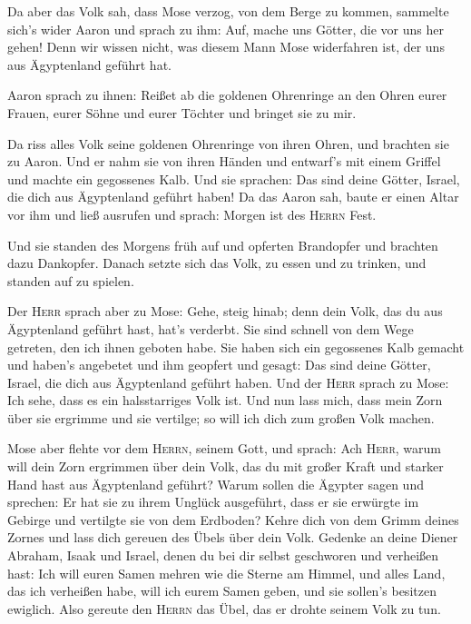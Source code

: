  Da aber das Volk sah, dass Mose verzog, von dem Berge zu
kommen, sammelte sich's wider Aaron und sprach zu ihm: Auf, mache uns
Götter, die vor uns her gehen! Denn wir wissen nicht, was diesem Mann
Mose widerfahren ist, der uns aus Ägyptenland geführt hat.

 Aaron sprach zu ihnen: Reißet ab die goldenen Ohrenringe
an den Ohren eurer Frauen, eurer Söhne und eurer Töchter und bringet sie
zu mir.

 Da riss alles Volk seine goldenen Ohrenringe von ihren
Ohren, und brachten sie zu Aaron.  Und er nahm sie von
ihren Händen und entwarf's mit einem Griffel und machte ein gegossenes
Kalb. Und sie sprachen: Das sind deine Götter, Israel, die dich aus
Ägyptenland geführt haben!  Da das Aaron sah, baute er
einen Altar vor ihm und ließ ausrufen und sprach: Morgen ist des
\textsc{Herrn} Fest.

 Und sie standen des Morgens früh auf und opferten
Brandopfer und brachten dazu Dankopfer. Danach setzte sich das Volk, zu
essen und zu trinken, und standen auf zu spielen.

 Der \textsc{Herr} sprach aber zu Mose: Gehe, steig hinab;
denn dein Volk, das du aus Ägyptenland geführt hast, hat's verderbt.
 Sie sind schnell von dem Wege getreten, den ich ihnen
geboten habe. Sie haben sich ein gegossenes Kalb gemacht und haben's
angebetet und ihm geopfert und gesagt: Das sind deine Götter, Israel,
die dich aus Ägyptenland geführt haben.  Und der
\textsc{Herr} sprach zu Mose: Ich sehe, dass es ein halsstarriges Volk
ist.  Und nun lass mich, dass mein Zorn über sie ergrimme
und sie vertilge; so will ich dich zum großen Volk machen.

 Mose aber flehte vor dem \textsc{Herrn}, seinem Gott,
und sprach: Ach \textsc{Herr}, warum will dein Zorn ergrimmen über dein
Volk, das du mit großer Kraft und starker Hand hast aus Ägyptenland
geführt?  Warum sollen die Ägypter sagen und sprechen: Er
hat sie zu ihrem Unglück ausgeführt, dass er sie erwürgte im Gebirge und
vertilgte sie von dem Erdboden? Kehre dich von dem Grimm deines Zornes
und lass dich gereuen des Übels über dein Volk.  Gedenke
an deine Diener Abraham, Isaak und Israel, denen du bei dir selbst
geschworen und verheißen hast: Ich will euren Samen mehren wie die
Sterne am Himmel, und alles Land, das ich verheißen habe, will ich eurem
Samen geben, und sie sollen's besitzen ewiglich.  Also
gereute den \textsc{Herrn} das Übel, das er drohte seinem Volk zu tun.

